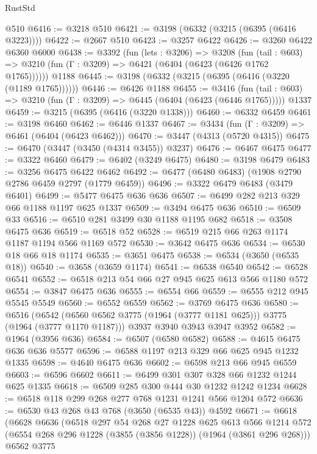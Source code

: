 \begin{lexlean}{RustStd}
\begin{coremodule}
    @510
@6416 := @3218 @510
@6421 := @3198 (@6332 (@3215 (@6395 (@6416 @3223))))
@6422 := @2667 @510
@6423 := @3257 @6422
@6426 := @3260 @6422 @6360 @6000
@6438 := @3392
    (fun (lets : @3206) =>
    @3208
      (fun (tail : @603) => @3210 (fun (Γ : @3209) => @6421 (@6404 (@6423 (@6426 @1762 @1765))))))
    @1188
@6445 := @3198 (@6332 (@3215 (@6395 (@6416 (@3220 (@1189 @1765))))))
@6446 := @6426 @1188
@6455 := @3416
    (fun (tail : @603) => @3210 (fun (Γ : @3209) => @6445 (@6404 (@6423 (@6446 @1765)))))
    @1337
@6459 := @3215 (@6395 (@6416 (@3220 @1338)))
@6460 := @6332 @6459
@6461 := @3198 @6460
@6462 := @6446 @1337
@6467 := @3434 (fun (Γ : @3209) => @6461 (@6404 (@6423 @6462)))
@6470 := @3447 (@4313 (@5720 @4315))
@6475 := @6470 (@3447 (@3450 (@4314 @3455)) @3237)
@6476 := @6467 @6475
@6477 := @3322 @6460
@6479 := @6402 (@3249 @6475)
@6480 := @3198 @6479
@6483 := @3256 @6475 @6422 @6462
@6492 := @6477 (@6480 @6483) (@1908 @2790 @2786 @6459 @2797 (@1779 @6459))
@6496 := @3322 @6479 @6483 (@3479 @6401)
@6499 := @5477 @6475 @636 @636
@6507 := @6499 @282 @213 @329 @66 @1188 @1197 @625 @1337
@6509 := @3494 @6475 @636
@6510 := @6509 @33
@6516 := @6510 @281 @3499 @30 @1188 @1195 @682
@6518 := @3508 @6475 @636
@6519 := @6518 @52
@6528 := @6519 @215 @66 @263 @1174 @1187 @1194 @566 @1169 @572
@6530 := @3642 @6475 @636
@6534 := @6530 @18 @66 @18 @1174
@6535 := @3651 @6475
@6538 := @6534 (@3650 (@6535 @18))
@6540 := @3658 (@3659 @1174)
@6541 := @6538 @6540
@6542 := @6528 @6541
@6552 := @6518 @213 @54 @66 @27 @945 @625 @613 @566 @1180 @572
@6554 := @3847 @6475 @636
@6555 := @6554 @66
@6559 := @6555 @212 @945 @5545 @5549
@6560 := @6552 @6559
@6562 := @3769 @6475 @636
@6580 := @6516
    (@6542 (@6560 @6562 @3775 (@1964 (@3777 @1181 @625))) @3775 (@1964 (@3777 @1170 @1187)))
    @3937
    @3940
    @3943
    @3947
    @3952
@6582 := @1964 (@3956 @636)
@6584 := @6507 (@6580 @6582)
@6588 := @4615 @6475 @636 @636 @5577
@6596 := @6588 @1197 @213 @329 @66 @625 @945 @1232 @1335
@6598 := @4640 @6475 @636
@6602 := @6598 @213 @66 @945 @6559
@6603 := @6596 @6602
@6611 := @6499 @301 @307 @328 @66 @1232 @1244 @625 @1335
@6618 := @6509 @285 @300 @444 @30 @1232 @1242 @1234
@6628 := @6518 @118 @299 @268 @277 @768 @1231 @1241 @566 @1204 @572
@6636 := @6530 @43 @268 @43 @768 (@3650 (@6535 @43)) @4592
@6671 := @6618
    (@6628
      @6636
      (@6518
        @297
        @54
        @268
        @27
        @1228
        @625
        @613
        @566
        @1214
        @572
        (@6554 @268 @296 @1228 (@3855 (@3856 @1228)) (@1964 (@3861 @296 @268)))
        @6562
        @3775

\end{coremodule}
\end{lexlean}
